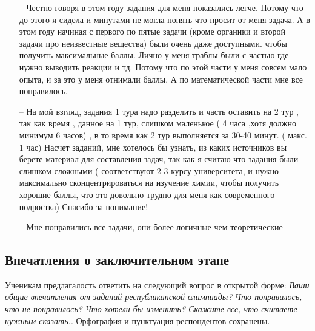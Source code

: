 \begin{itemize}
    \item[--] Честно говоря в этом году задания для меня показались легче. Потому что до этого я сидела и минутами не могла понять что просит от меня задача. А в этом году начиная с первого по пятые задачи (кроме органики и второй задачи про неизвестные вещества) были очень даже доступными. чтобы получить максимальные баллы. Лично у меня траблы были с частью где нужно выводить реакции и тд. Потому что по этой части у меня совсем мало опыта, и за это у меня отнимали баллы. А по математической части мне все понравилось.
    \item[--] На мой взгляд, задания 1 тура надо разделить и часть оставить на 2 тур , так как время , данное на 1 тур, слишком маленькое ( 4 часа ,хотя должно минимум 6 часов) , в то время как 2 тур выполняется за 30-40 минут. ( макс. 1 час) Насчет заданий, мне хотелось бы узнать, из каких источников вы берете материал для составления задач, так как я считаю что задания были слишком сложными ( соответствуют 2-3 курсу университета, и нужно максимально сконцентрироваться на изучение химии, чтобы получить хорошие баллы, что это довольно трудно для меня как современного подростка) Спасибо за понимание!
    \item[--] Мне понравились все задачи, они более логичные чем теоретические
\end{itemize}

\subsection{Впечатления о заключительном этапе}
Ученикам предлагалость ответить на следующий вопрос в открытой форме: \textit{Ваши общие впечатления от заданий республиканской олимпиады? Что понравилось, что не понравилось? Что хотели бы изменить? Скажите все, что считаете нужным сказать.}. Орфография и пунктуация респондентов сохранены.

